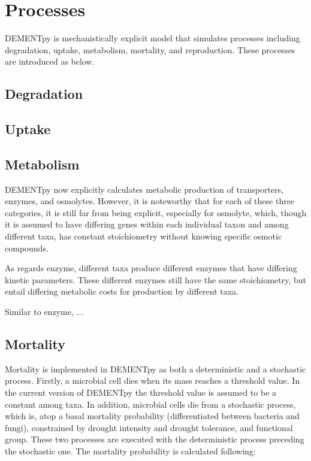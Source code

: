 \documentclass[12pt, oneside, titlepage]{article}   	%
\begin{document}
\section{Processes}
DEMENTpy is mechanistically explicit model that simulates processes including degradation, uptake, metabolism, mortality, and reproduction. These processes are introduced as below.

\subsection{Degradation}

\subsection{Uptake}

\subsection{Metabolism}

DEMENTpy now explicitly calculates metabolic production of transporters, enzymes, and osmolytes. However, it is noteworthy that for each of these three categories, it is still far from being explicit, especially for osmolyte, which, though it is assumed to have differing genes within each individual taxon and among different taxa, has constant stoichiometry without knowing specific osmotic compounds.

As regards enzyme, different taxa produce different enzymes that have differing kinetic parameters. These different enzymes still have the same stoichiometry, but entail differing metabolic costs for production by different taxa. 

Similar to enzyme, ...

\subsection{Mortality}
Mortality is implemented in DEMENTpy as both a deterministic and a stochastic process. Firstly, a microbial cell dies when its mass reaches a threshold value. In the current version of DEMENTpy the threshold value is assumed to be a constant among taxa. In addition, microbial cells die from a stochastic process, which is, atop a basal mortality probability (differentiated between bacteria and fungi), constrained by drought intensity and drought tolerance, and functional group. These two processes are executed with the deterministic process preceding the stochastic one. The mortality probability is calculated following:
\end{document}
